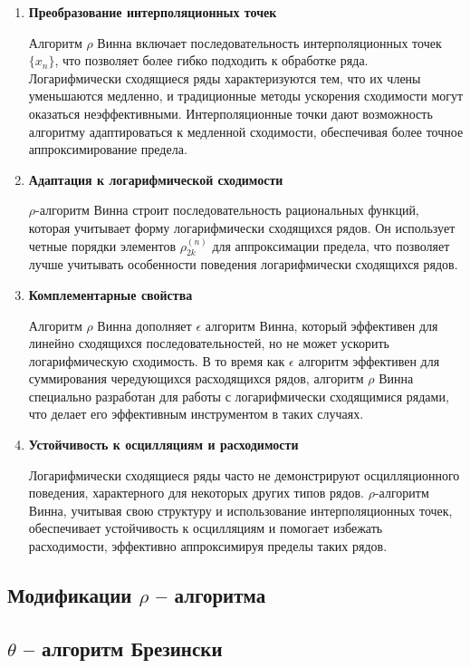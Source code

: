 \documentclass[14pt, a4paper]{extarticle}
\theoremstyle{definition}
\theoremstyle{remark}
\begin{document}
\begin{enumerate}
\item \textbf{Преобразование интерполяционных точек}

Алгоритм \emph{$\rho$} Винна включает последовательность интерполяционных
точек \(\{ x_{n}\}\), что позволяет более гибко подходить к обработке
ряда. Логарифмически сходящиеся ряды характеризуются тем, что их члены
уменьшаются медленно, и традиционные методы ускорения сходимости могут
оказаться неэффективными. Интерполяционные точки дают возможность
алгоритму адаптироваться к медленной сходимости, обеспечивая более
точное аппроксимирование предела.

  \item \textbf{Адаптация к логарифмической сходимости}

\emph{$\rho$}-алгоритм Винна строит последовательность рациональных функций,
которая учитывает форму логарифмически сходящихся рядов. Он использует
четные порядки элементов \(\rho_{2k}^{(n)}\) для аппроксимации предела,
что позволяет лучше учитывать особенности поведения логарифмически
сходящихся рядов.

  \item \textbf{Комплементарные свойства}

Алгоритм \emph{$\rho$} Винна дополняет \(\epsilon\) алгоритм Винна, который эффективен
для линейно сходящихся последовательностей, но не может ускорить
логарифмическую сходимость. В то время как \(\epsilon\) алгоритм эффективен для
суммирования чередующихся расходящихся рядов, алгоритм \emph{$\rho$} Винна
специально разработан для работы с логарифмически сходящимися рядами,
что делает его эффективным инструментом в таких случаях.
\item \textbf{Устойчивость к осцилляциям и расходимости}

Логарифмически сходящиеся ряды часто не демонстрируют осцилляционного
поведения, характерного для некоторых других типов рядов.
\emph{$\rho$}-алгоритм Винна, учитывая свою структуру и использование
интерполяционных точек, обеспечивает устойчивость к осцилляциям и
помогает избежать расходимости, эффективно аппроксимируя пределы таких
рядов.
\end{enumerate}

\subsection*{Модификации $\rho$ -- алгоритма}

\subsection{$\theta$ -- алгоритм Брезински}
\end{document}
